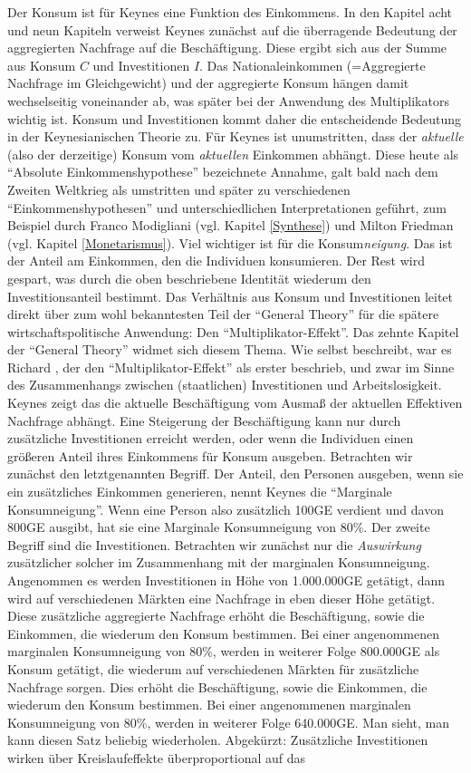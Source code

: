 Der Konsum ist für Keynes eine Funktion des Einkommens. In den Kapitel acht und neun Kapiteln verweist Keynes zunächst auf die überragende Bedeutung der aggregierten Nachfrage auf die Beschäftigung. Diese ergibt sich aus der Summe aus Konsum $C$ und Investitionen $I$. Das Nationaleinkommen (=Aggregierte Nachfrage im Gleichgewicht) und der aggregierte Konsum hängen damit wechselseitig voneinander ab, was später bei der Anwendung des Multiplikators wichtig ist. Konsum und Investitionen kommt daher die entscheidende Bedeutung in der Keynesianischen Theorie zu. Für Keynes ist unumstritten, dass der \textit{aktuelle} (also der derzeitige) Konsum vom \textit{aktuellen} Einkommen abhängt. Diese heute als "`Absolute Einkommenshypothese"' bezeichnete Annahme, galt bald nach dem Zweiten Weltkrieg als umstritten und später zu verschiedenen "`Einkommenshypothesen"' und unterschiedlichen Interpretationen geführt, zum Beispiel durch Franco Modigliani (vgl. Kapitel \ref{Synthese}) und Milton Friedman (vgl. Kapitel \ref{Monetarismus}). Viel wichtiger ist für \textcite[S. 89, S. 107]{Keynes1936} die Konsum\textit{neigung}. Das ist der Anteil am Einkommen, den die Individuen konsumieren. Der Rest wird gespart, was durch die oben beschriebene Identität wiederum den Investitionsanteil bestimmt. Das Verhältnis aus Konsum und Investitionen leitet direkt über zum wohl bekanntesten Teil der "`General Theory"' für die spätere wirtschaftspolitische Anwendung: Den "`Multiplikator-Effekt"'. Das zehnte Kapitel der "`General Theory"' widmet sich diesem Thema. Wie \textcite[S. 114]{Keynes1936} selbst beschreibt, war es Richard \textcite{Kahn1931}, der den "`Multiplikator-Effekt"' als erster beschrieb, und zwar im Sinne des Zusammenhangs zwischen (staatlichen) Investitionen und Arbeitslosigkeit. Keynes zeigt das die aktuelle Beschäftigung vom Ausmaß der aktuellen Effektiven Nachfrage abhängt. Eine Steigerung der Beschäftigung kann nur durch zusätzliche Investitionen erreicht werden, oder wenn die Individuen einen größeren Anteil ihres Einkommens für Konsum ausgeben.  Betrachten wir zunächst den letztgenannten Begriff. Der Anteil, den Personen ausgeben, wenn sie ein zusätzliches Einkommen generieren, nennt Keynes die "`Marginale Konsumneigung"'. Wenn eine Person also zusätzlich 100GE verdient und davon 800GE ausgibt, hat sie eine Marginale Konsumneigung von 80\%. Der zweite Begriff sind die Investitionen. Betrachten wir zunächst nur die \textit{Auswirkung} zusätzlicher solcher im Zusammenhang mit der marginalen Konsumneigung. Angenommen es werden Investitionen in Höhe von 1.000.000GE getätigt, dann wird auf verschiedenen Märkten eine Nachfrage in eben dieser Höhe getätigt. Diese zusätzliche aggregierte Nachfrage erhöht die Beschäftigung, sowie die Einkommen, die wiederum den Konsum bestimmen. Bei einer angenommenen marginalen Konsumneigung von 80\%, werden in weiterer Folge 800.000GE als Konsum getätigt, die wiederum auf verschiedenen Märkten für zusätzliche Nachfrage sorgen. Dies erhöht die Beschäftigung, sowie die Einkommen, die wiederum den Konsum bestimmen. Bei einer angenommenen marginalen Konsumneigung von 80\%, werden in weiterer Folge 640.000GE. Man sieht, man kann diesen Satz beliebig wiederholen. Abgekürzt: Zusätzliche Investitionen wirken über Kreislaufeffekte überproportional auf das 